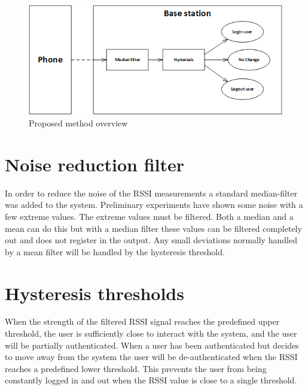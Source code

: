 \begin{figure}[!t]
	\centering
	\includegraphics[width=0.5\paperwidth]{img/SolutionOverview}
	\caption{ Proposed method overview }
	\label{fig_solution_overview}
\end{figure}



\section{Noise reduction filter}
In order to reduce the noise of the RSSI measurements a standard median-filter was added to the system.
Preliminary experiments have shown some noise with a few extreme values.
The extreme values must be filtered. Both a median and a mean can do this but with a median filter these values can be filtered completely out and does not register in the output. Any small deviations normally handled by a mean filter will be handled by the hysteresis threshold.

\section{Hysteresis thresholds}
When the strength of the filtered RSSI signal reaches the predefined upper threshold, the user is sufficiently close to interact with the system, and the user will be partially authenticated.
When a user has been authenticated but decides to move away from the system the user will be de-authenticated when the RSSI reaches a predefined lower threshold.
This prevents the user from being constantly logged in and out when the RSSI value is close to a single threshold.
